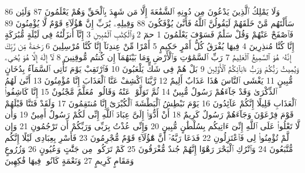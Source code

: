 {\tiny\colorbox{cl_aya}{86}} وَلَا يَمْلِكُ ٱلَّذِينَ يَدْعُونَ مِن دُونِهِ ٱلشَّفَٰعَةَ إِلَّا مَن شَهِدَ بِٱلْحَقِّ وَهُمْ يَعْلَمُونَ
{\tiny\colorbox{cl_aya}{87}} وَلَئِن سَأَلْتَهُم مَّنْ خَلَقَهُمْ لَيَقُولُنَّ ٱللَّهُ فَأَنَّىٰ يُؤْفَكُونَ
{\tiny\colorbox{cl_aya}{88}} وَقِيلِهِۦ يَٰرَبِّ إِنَّ هَٰٓؤُلَآءِ قَوْمٌ لَّا يُؤْمِنُونَ
{\tiny\colorbox{cl_aya}{89}} فَٱصْفَحْ عَنْهُمْ وَقُلْ سَلَٰمٌ فَسَوْفَ يَعْلَمُونَ
{\tiny\colorbox{cl_aya}{1}} حمٓ
{\tiny\colorbox{cl_aya}{2}} وَٱلْكِتَٰبِ ٱلْمُبِينِ
{\tiny\colorbox{cl_aya}{3}} إِنَّآ أَنزَلْنَٰهُ فِى لَيْلَةٍ مُّبَٰرَكَةٍ إِنَّا كُنَّا مُنذِرِينَ
{\tiny\colorbox{cl_aya}{4}} فِيهَا يُفْرَقُ كُلُّ أَمْرٍ حَكِيمٍ
{\tiny\colorbox{cl_aya}{5}} أَمْرًا مِّنْ عِندِنَآ إِنَّا كُنَّا مُرْسِلِينَ
{\tiny\colorbox{cl_aya}{6}} رَحْمَةً مِّن رَّبِّكَ إِنَّهُۥ هُوَ ٱلسَّمِيعُ ٱلْعَلِيمُ
{\tiny\colorbox{cl_aya}{7}} رَبِّ ٱلسَّمَٰوَٰتِ وَٱلْأَرْضِ وَمَا بَيْنَهُمَآ إِن كُنتُم مُّوقِنِينَ
{\tiny\colorbox{cl_aya}{8}} لَآ إِلَٰهَ إِلَّا هُوَ يُحْىِۦ وَيُمِيتُ رَبُّكُمْ وَرَبُّ ءَابَآئِكُمُ ٱلْأَوَّلِينَ
{\tiny\colorbox{cl_aya}{9}} بَلْ هُمْ فِى شَكٍّ يَلْعَبُونَ
{\tiny\colorbox{cl_aya}{10}} فَٱرْتَقِبْ يَوْمَ تَأْتِى ٱلسَّمَآءُ بِدُخَانٍ مُّبِينٍ
{\tiny\colorbox{cl_aya}{11}} يَغْشَى ٱلنَّاسَ هَٰذَا عَذَابٌ أَلِيمٌ
{\tiny\colorbox{cl_aya}{12}} رَّبَّنَا ٱكْشِفْ عَنَّا ٱلْعَذَابَ إِنَّا مُؤْمِنُونَ
{\tiny\colorbox{cl_aya}{13}} أَنَّىٰ لَهُمُ ٱلذِّكْرَىٰ وَقَدْ جَآءَهُمْ رَسُولٌ مُّبِينٌ
{\tiny\colorbox{cl_aya}{14}} ثُمَّ تَوَلَّوْا۟ عَنْهُ وَقَالُوا۟ مُعَلَّمٌ مَّجْنُونٌ
{\tiny\colorbox{cl_aya}{15}} إِنَّا كَاشِفُوا۟ ٱلْعَذَابِ قَلِيلًا إِنَّكُمْ عَآئِدُونَ
{\tiny\colorbox{cl_aya}{16}} يَوْمَ نَبْطِشُ ٱلْبَطْشَةَ ٱلْكُبْرَىٰٓ إِنَّا مُنتَقِمُونَ
{\tiny\colorbox{cl_aya}{17}} وَلَقَدْ فَتَنَّا قَبْلَهُمْ قَوْمَ فِرْعَوْنَ وَجَآءَهُمْ رَسُولٌ كَرِيمٌ
{\tiny\colorbox{cl_aya}{18}} أَنْ أَدُّوٓا۟ إِلَىَّ عِبَادَ ٱللَّهِ إِنِّى لَكُمْ رَسُولٌ أَمِينٌ
{\tiny\colorbox{cl_aya}{19}} وَأَن لَّا تَعْلُوا۟ عَلَى ٱللَّهِ إِنِّىٓ ءَاتِيكُم بِسُلْطَٰنٍ مُّبِينٍ
{\tiny\colorbox{cl_aya}{20}} وَإِنِّى عُذْتُ بِرَبِّى وَرَبِّكُمْ أَن تَرْجُمُونِ
{\tiny\colorbox{cl_aya}{21}} وَإِن لَّمْ تُؤْمِنُوا۟ لِى فَٱعْتَزِلُونِ
{\tiny\colorbox{cl_aya}{22}} فَدَعَا رَبَّهُۥٓ أَنَّ هَٰٓؤُلَآءِ قَوْمٌ مُّجْرِمُونَ
{\tiny\colorbox{cl_aya}{23}} فَأَسْرِ بِعِبَادِى لَيْلًا إِنَّكُم مُّتَّبَعُونَ
{\tiny\colorbox{cl_aya}{24}} وَٱتْرُكِ ٱلْبَحْرَ رَهْوًا إِنَّهُمْ جُندٌ مُّغْرَقُونَ
{\tiny\colorbox{cl_aya}{25}} كَمْ تَرَكُوا۟ مِن جَنَّٰتٍ وَعُيُونٍ
{\tiny\colorbox{cl_aya}{26}} وَزُرُوعٍ وَمَقَامٍ كَرِيمٍ
{\tiny\colorbox{cl_aya}{27}} وَنَعْمَةٍ كَانُوا۟ فِيهَا فَٰكِهِينَ
